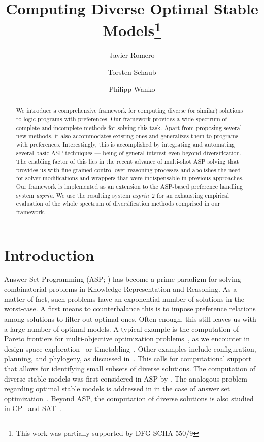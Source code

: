 \documentclass[a4paper,UKenglish]{oasics}
\title{Computing Diverse Optimal Stable Models\footnote{This work was partially supported by DFG-SCHA-550/9}}
\author[1]{Javier Romero}
\author[1,2]{Torsten Schaub}
\author[1]{Philipp Wanko}
\affil[1]{University of Potsdam, Germany}
\affil[2]{INRIA, Rennes}
\newcommand{\sysfont}{\textit}
\newcommand{\asprin}{\sysfont{asprin}}
\begin{document}
\maketitle
%
%
\makeatletter{}%
\begin{abstract}
We introduce a comprehensive framework for computing diverse (or similar) solutions to logic programs with preferences.
Our framework provides a wide spectrum of complete and incomplete methods for solving this task.
Apart from proposing several new methods, it also accommodates existing ones and generalizes them to programs with preferences.
Interestingly, this is accomplished by integrating and automating several basic ASP techniques --- being of general interest even beyond diversification.
The enabling factor of this lies in the recent advance of multi-shot ASP solving that provides us with fine-grained control over reasoning
processes and abolishes the need for solver modifications and wrappers that were indispensable in previous approaches.
Our framework is implemented as an extension to the ASP-based preference handling system \asprin.
We use the resulting system \asprin~2 for an exhausting empirical evaluation of the
whole spectrum of diversification methods comprised in our framework.
\end{abstract}

%
%
%
%

%
%
\makeatletter{}%

\section{Introduction}\label{sec:introduction}
 
Answer Set Programming (ASP; \cite{baral02a}) has become a prime paradigm for solving combinatorial problems in Knowledge Representation and Reasoning. 
As a matter of fact,
such problems have an exponential number of solutions in the worst-case.
A first means to counterbalance this is to impose preference relations among solutions
to filter out optimal ones.
Often enough, this still leaves us with a large number of optimal models.
%
A typical example is the computation of Pareto frontiers for multi-objective optimization problems~\cite{pareto64a},
as we encounter in design space exploration~\cite{angeglharesc13a} or timetabling~\cite{basotainsc13a}.
%
Other examples include configuration, planning, and phylogeny, as discussed in~\cite{eiererfi13a}.
%
This calls for computational support that allows for identifying small subsets of diverse solutions.
%
The computation of diverse stable models was first considered in ASP by \cite{eiererfi13a}.
The analogous problem regarding optimal stable models is addressed in \cite{zhutru13a} in the case of answer set optimization~\cite{brnitr03a}.
Beyond ASP, the computation of diverse solutions is also studied in CP~\cite{hehnocwa05a} and SAT~\cite{nadel11a}.
\end{document}
